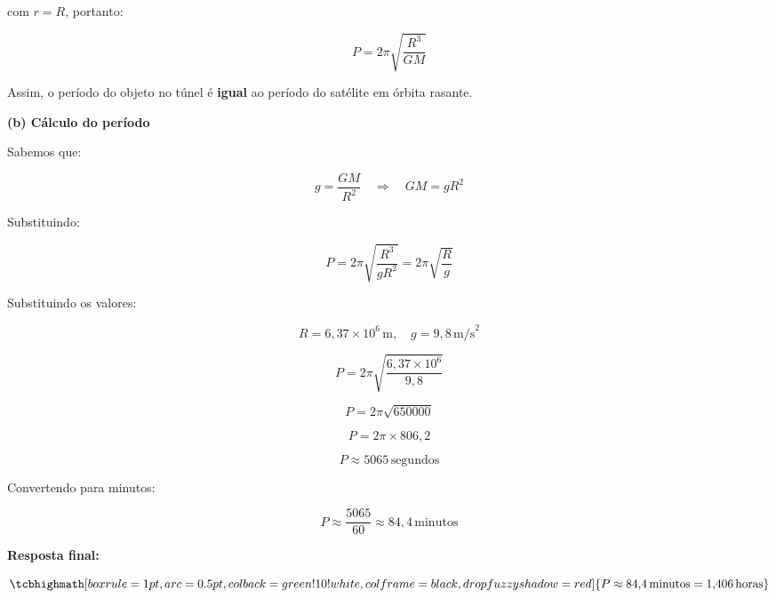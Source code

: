 \documentclass[a4paper,12pt]{article}
\begin{document}
\begin{flushleft}
com \( r = R \), portanto:

\begin{equation}
P = 2\pi \sqrt{\frac{R^3}{G M}}
\end{equation}

Assim, o período do objeto no túnel é \textbf{igual} ao período do satélite em órbita rasante.

\vspace{0.5cm}

\textbf{(b) Cálculo do período}

Sabemos que:

\begin{equation}
g = \frac{G M}{R^2}
\quad \Rightarrow \quad G M = g R^2
\end{equation}

Substituindo:

\begin{equation}
P = 2\pi \sqrt{ \frac{R^3}{g R^2} } = 2\pi \sqrt{ \frac{R}{g} }
\end{equation}

Substituindo os valores:

\begin{equation}
R = 6{,}37 \times 10^6 \, \text{m}, \quad g = 9{,}8 \, \text{m/s}^2
\end{equation}

\begin{equation}
P = 2\pi \sqrt{ \frac{6{,}37 \times 10^6}{9{,}8} }
\end{equation}

\begin{equation}
P = 2\pi \sqrt{650000}
\end{equation}

\begin{equation}
P = 2\pi \times 806{,}2
\end{equation}

\begin{equation}
P \approx 5065 \, \text{segundos}
\end{equation}

Convertendo para minutos:

\begin{equation}
P \approx \frac{5065}{60} \approx 84{,}4 \, \text{minutos}
\end{equation}

\vspace{0.5cm}

\textbf{Resposta final:}

\begin{equation}
    \tcbhighmath[boxrule=1pt,arc=0.5pt,colback=green!10!white,colframe=black,
      drop fuzzy shadow=red]{P \approx 84{,}4 \, \text{minutos} = 1{,}406 \, \text{horas}}
\end{equation}

\end{flushleft}
\end{document}
